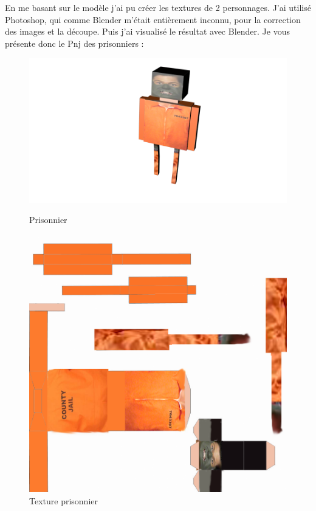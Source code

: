 \documentclass{article}
\begin{document}
\newpage
En me basant sur le modèle j’ai pu créer les textures de 2 personnages. J’ai utilisé Photoshop, qui comme Blender m’était entièrement inconnu, pour la correction des images et la découpe. Puis j’ai visualisé le résultat avec Blender. Je vous présente donc le Pnj des prisonniers :
\newline


\begin{figure}[htbp]
\begin{minipage}[c]{.45\linewidth}
\begin{center}
\includegraphics[scale=0.5]{prisonnierblend.png}
\caption{Prisonnier}
\end{center}
\end{minipage}
\hfill
\begin{minipage}[c]{.45\linewidth}
\begin{center}
\includegraphics[scale=0.2]{prisonnier.png}
\caption{Texture prisonnier}
\end{center}
\end{minipage}
\end{figure}
\end{document}
